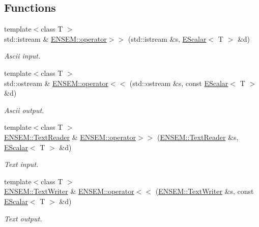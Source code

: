 \subsection*{Functions}
\begin{DoxyCompactItemize}
\item 
{\footnotesize template$<$class T $>$ }\\std\+::istream \& \mbox{\hyperlink{group__escalar_gae1745a4a5cc3b43ab391d57412135dbd}{E\+N\+S\+E\+M\+::operator$>$$>$}} (std\+::istream \&s, \mbox{\hyperlink{classENSEM_1_1EScalar}{E\+Scalar}}$<$ T $>$ \&d)
\begin{DoxyCompactList}\small\item\em Ascii input. \end{DoxyCompactList}\item 
{\footnotesize template$<$class T $>$ }\\std\+::ostream \& \mbox{\hyperlink{group__escalar_ga2a24d07560f549aee97bb63ceed9ed50}{E\+N\+S\+E\+M\+::operator$<$$<$}} (std\+::ostream \&s, const \mbox{\hyperlink{classENSEM_1_1EScalar}{E\+Scalar}}$<$ T $>$ \&d)
\begin{DoxyCompactList}\small\item\em Ascii output. \end{DoxyCompactList}\item 
{\footnotesize template$<$class T $>$ }\\\mbox{\hyperlink{classENSEM_1_1TextReader}{E\+N\+S\+E\+M\+::\+Text\+Reader}} \& \mbox{\hyperlink{group__escalar_ga0011ba4db6e989d9517d29f0dd411ba4}{E\+N\+S\+E\+M\+::operator$>$$>$}} (\mbox{\hyperlink{classENSEM_1_1TextReader}{E\+N\+S\+E\+M\+::\+Text\+Reader}} \&s, \mbox{\hyperlink{classENSEM_1_1EScalar}{E\+Scalar}}$<$ T $>$ \&d)
\begin{DoxyCompactList}\small\item\em Text input. \end{DoxyCompactList}\item 
{\footnotesize template$<$class T $>$ }\\\mbox{\hyperlink{classENSEM_1_1TextWriter}{E\+N\+S\+E\+M\+::\+Text\+Writer}} \& \mbox{\hyperlink{group__escalar_ga4fa895e4a145c879739c3f8497717e98}{E\+N\+S\+E\+M\+::operator$<$$<$}} (\mbox{\hyperlink{classENSEM_1_1TextWriter}{E\+N\+S\+E\+M\+::\+Text\+Writer}} \&s, const \mbox{\hyperlink{classENSEM_1_1EScalar}{E\+Scalar}}$<$ T $>$ \&d)
\begin{DoxyCompactList}\small\item\em Text output. \end{DoxyCompactList}\item 

\end{DoxyCompactItemize}
